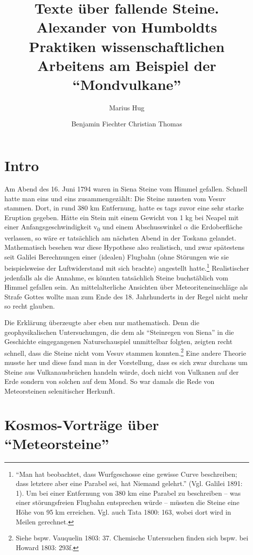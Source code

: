 \documentclass[output=paper]{langsci/langscibook}
\title{Texte über fallende Steine. Alexander von Humboldts Praktiken wissenschaftlichen Arbeitens am Beispiel der \enquote{Mondvulkane}}
\author{Marius Hug \and Benjamin Fiechter \lastand  Christian Thomas}
\begin{document}
\maketitle

\section*{Intro}\label{intro}

Am Abend des 16. Juni 1794 waren in Siena Steine vom Himmel gefallen.
Schnell hatte man eins und eins zusammengezählt: Die Steine mussten vom
Vesuv stammen. Dort, in rund 380 km Entfernung, hatte es tags zuvor eine
sehr starke Eruption gegeben. Hätte ein Stein mit einem Gewicht von 1 kg
bei Neapel mit einer Anfangsgeschwindigkeit v\textsubscript{0} und einem
Abschusswinkel $\alpha$ die Erdoberfläche verlassen, so wäre er tatsächlich am
nächsten Abend in der Toskana gelandet. Mathematisch besehen war diese
Hypothese also realistisch, und zwar spätestens seit Galilei
Berechnungen einer (idealen) Flugbahn (ohne Störungen wie sie
beispielsweise der Luftwiderstand mit sich brachte) angestellt
hatte.\footnote{\enquote{Man hat beobachtet, dass Wurfgeschosse eine
  gewisse Curve beschreiben; dass letztere aber eine Parabel sei, hat
  Niemand gelehrt.} (Vgl. Galilei 1891: 1). Um bei einer Entfernung von
  380 km eine Parabel zu beschreiben -- was einer störungsfreien
  Flugbahn entsprechen würde -- müssten die Steine eine Höhe von 95 km
  erreichen. Vgl. auch Tata 1800: 163, wobei dort wird in Meilen
  gerechnet.} Realistischer jedenfalls als die Annahme, es könnten
tatsächlich Steine buchstäblich vom Himmel gefallen sein. An
mittelalterliche Ansichten über Meteoriteneinschläge als Strafe Gottes
wollte man zum Ende des 18. Jahrhunderts in der Regel nicht mehr so
recht glauben.

Die Erklärung überzeugte aber eben nur mathematisch. Denn die
geophysika\-lischen Untersuchungen, die dem als \enquote{Steinregen von
Siena} in die Geschichte eingegangenen Naturschauspiel unmittelbar
folgten, zeigten recht schnell, dass die Steine nicht vom Vesuv stammen
konnten.\footnote{Siehe bspw. Vauquelin 1803: 37. Chemische Untersuchen
  finden sich bspw. bei Howard 1803: 293f.} Eine andere Theorie musste
her und diese fand man in der Vorstellung, dass es sich zwar durchaus um
Steine aus Vulkanausbrüchen handeln würde, doch nicht von Vulkanen auf
der Erde sondern von solchen auf dem Mond. So war damals die Rede von
Meteorsteinen selenitischer Herkunft.

\section*{\texorpdfstring{Kosmos-Vorträge über
\enquote{Meteorsteine}}{Kosmos-Vorträge über Meteorsteine}}\label{kosmos-vortruxe4ge-uxfcber-meteorsteine}
\end{document}
